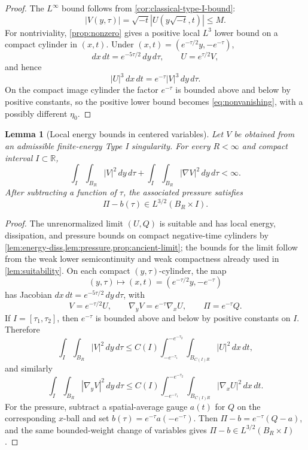 \documentclass[11pt]{amsart}
\theoremstyle{plain}
\newtheorem{lemma}[theorem]{Lemma}
\theoremstyle{definition}
\theoremstyle{remark}
\numberwithin{equation}{section}
\newcommand{\R}{\mathbb R}
\begin{document}
\begin{proof}
The \(L^\infty\) bound follows from \cref{cor:classical-type-I-bound}:
\[
   |V(y,\tau)|=\sqrt{-t}|U(y\sqrt{-t},t)|\le M.
\]
For nontriviality, \cref{prop:nonzero} gives a positive local \(L^3\) lower bound
on a compact cylinder in \((x,t)\).  Under
\((x,t)=(e^{-\tau/2}y,-e^{-\tau})\),
\[
   dx\,dt=e^{-5\tau/2}\,dy\,d\tau,\qquad
   U=e^{\tau/2}V,
\]
and hence
\[
   |U|^3\,dx\,dt=e^{-\tau}|V|^3\,dy\,d\tau .
\]
On the compact image cylinder the factor \(e^{-\tau}\) is bounded above and
below by positive constants, so the positive lower bound becomes
\eqref{eq:nonvanishing}, with a possibly different \(\eta_0\).
\end{proof}

\begin{lemma}[Local energy bounds in centered variables]
\label{lem:centered-local-energy}
Let \(V\) be obtained from an admissible finite-energy Type I singularity.  For every
\(R<\infty\) and
compact interval \(I\subset\R\),
\[
   \int_I\int_{B_R}|V|^2\,dy\,d\tau
   +
   \int_I\int_{B_R}|\nabla V|^2\,dy\,d\tau<\infty .
\]
After subtracting a function of \(\tau\), the associated pressure satisfies
\[
   \Pi-b(\tau)\in L^{3/2}(B_R\times I).
\]
\end{lemma}

\begin{proof}
The unrenormalized limit \((U,Q)\) is suitable and has local energy,
dissipation, and pressure bounds on compact negative-time cylinders by
\cref{lem:energy-diss,lem:pressure,prop:ancient-limit}; the bounds for the
limit follow from the weak lower semicontinuity and weak compactness already
used in \cref{lem:suitability}.  On each compact
\((y,\tau)\)-cylinder, the map
\[
   (y,\tau)\mapsto (x,t)=(e^{-\tau/2}y,-e^{-\tau})
\]
has Jacobian \(dx\,dt=e^{-5\tau/2}\,dy\,d\tau\), with
\[
   V=e^{-\tau/2}U,\qquad
   \nabla_yV=e^{-\tau}\nabla_xU,\qquad
   \Pi=e^{-\tau}Q .
\]
If \(I=[\tau_1,\tau_2]\), then \(e^{-\tau}\) is bounded above and below by
positive constants on \(I\).  Therefore
\[
   \int_I\int_{B_R}|V|^2\,dy\,d\tau
   \le C(I)\int_{-e^{-\tau_1}}^{-e^{-\tau_2}}
       \int_{B_{C(I)R}}|U|^2\,dx\,dt,
\]
and similarly
\[
   \int_I\int_{B_R}|\nabla_yV|^2\,dy\,d\tau
   \le C(I)\int_{-e^{-\tau_1}}^{-e^{-\tau_2}}
       \int_{B_{C(I)R}}|\nabla_xU|^2\,dx\,dt.
\]
For the pressure, subtract a spatial-average gauge \(a(t)\) for \(Q\) on the
corresponding \(x\)-ball and set \(b(\tau)=e^{-\tau}a(-e^{-\tau})\).  Then
\(\Pi-b=e^{-\tau}(Q-a)\), and the same bounded-weight change of variables
gives \(\Pi-b\in L^{3/2}(B_R\times I)\).
\end{proof}
\end{document}
